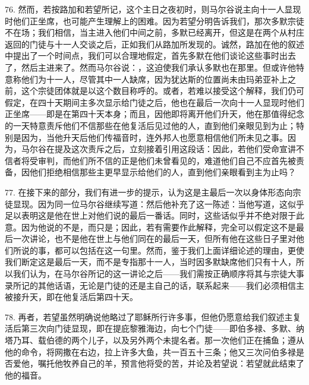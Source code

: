 76. 然而，若按路加和若望所记，这个主日之夜初时，则马尔谷说主向十一人显现时他们正坐席，也可能产生理解上的困难。因为若望分明告诉我们，那次多默宗徒不在场；我们相信，当主进入他们中间之前，多默已经离开，但这是在两个从村庄返回的门徒与十一人交谈之后，正如我们从路加所发现的。诚然，路加在他的叙述中提出了一个时间点，我们可以合理地假定，首先多默在他们谈论这些事时出去了，然后主进来了。然而马尔谷说：，这迫使我们承认多默也在那里。但或许他特意称他们为十一人，尽管其中一人缺席，因为犹达斯的位置尚未由玛弟亚补上之前，这个宗徒团体就是以这个数目称呼的。或者，若难以接受这个解释，我们仍可假定，在四十天期间主多次显示给门徒之后，他也在最后一次向十一人显现时他们正坐席——即是在第四十天本身；而且，因他即将离开他们升天，他在那值得纪念的一天特意责斥他们不信那些在他复活后见过他的人，直到他们亲眼见到为止；特别是因为，当他升天后他们传福音时，连外邦人也愿意相信他们所未见之事。因为，马尔谷在提及这次责斥之后，立刻接着引用这段话：因此，若他们受命宣讲不信者将受审判，而他们所不信的正是他们未曾看见的，难道他们自己不应首先被责备，因他们拒绝相信那些主更早显示给他们的人，直到他们亲眼看到主为止吗？\par

77. 在接下来的部分，我们有进一步的提示，认为这是主最后一次以身体形态向宗徒显现。因为同一位马尔谷继续写道：然后他补充了这一陈述：当他写道，这似乎足以表明这是他在世上对他们说的最后一番话。同时，这些话似乎并不绝对限于此意。因为他说的不是，而只是；因此，若有需要作此解释，完全可以假定这不是最后一次讲论，也不是他在世上与他们同在的最后一天，但所有他在这些日子里对他们所说的事，都可以包括在这一句里。然而，鉴于我们上面详细论述的理由，更使我们断定这是最后一天，而不是专指那十一人，当时因多默缺席他们只有十人，所以我们认为，在马尔谷所记的这一讲论之后——我们需按正确顺序将其与宗徒大事录所记的其他话语，无论是门徒的还是主自己的话，联系起来——我们必须相信主被接升天，即在他复活后第四十天。\par

78. 再者，若望虽然明确说他略过了耶稣所行许多事，但他仍愿意给我们叙述主复活后第三次向门徒显现，即在提庇黎雅海边，向七个门徒——即伯多禄、多默、纳塔乃耳、载伯德的两个儿子，以及另外两个未提名者。那一次他们正在捕鱼；遵从他的命令，将网撒在右边，拉上许多大鱼，共一百五十三条；他又三次问伯多禄是否爱他，嘱托他牧养自己的羊，预言他将受的苦，并论及若望说：若望就此结束了他的福音。\par

